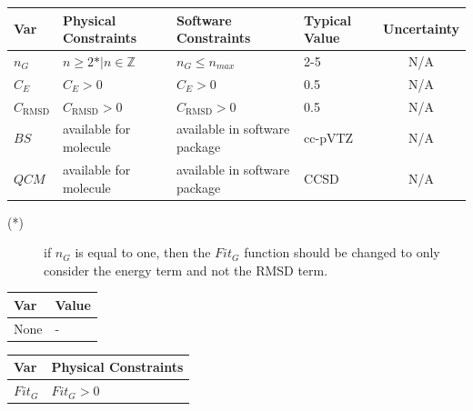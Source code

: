 \documentclass[12pt]{article}
\begin{document}
\begin{table}[!h]
  \caption{Input Variables} \label{TblInputVar}
  \renewcommand{\arraystretch}{1.2}
\noindent \begin{longtable*}{l l l l c} 
  \toprule
  \textbf{Var} & \textbf{Physical Constraints} & \textbf{Software Constraints} &
                             \textbf{Typical Value} & \textbf{Uncertainty}\\
  \midrule 
  $n_G$ & $n\geq 2\text{*} | n\in{\mathbb{Z}}$ & $n_G \leq n_{max}$ & 2-5 & N/A 
  \\
  $C_E$ & $C_E > 0$ & $C_E > 0$ & 0.5 & N/A \\
  $C_\text{RMSD}$ & $C_\text{RMSD} > 0$ & $C_\text{RMSD} > 0$ & 0.5 & N/A \\
  $BS$ & available for molecule & available in software package & cc-pVTZ & N/A 
  \\
  $QCM$& available for molecule & available in software package & CCSD & N/A \\
  \bottomrule
\end{longtable*}
\end{table}

\noindent 
\begin{description}
\item[(*)] if $n_G$ is equal to one, then the $Fit_G$ function should be 
changed to only consider the energy term and not the RMSD term.
\end{description}

\begin{table}[!h]
\caption{Specification Parameter Values} \label{TblSpecParams}
\renewcommand{\arraystretch}{1.2}
\noindent \begin{longtable*}{l l} 
  \toprule
  \textbf{Var} & \textbf{Value} \\
  \midrule 
  None & - \\
  \bottomrule
\end{longtable*}
\end{table}

\begin{table}[!h]
\caption{Output Variables} \label{TblOutputVar}
\renewcommand{\arraystretch}{1.2}
\noindent \begin{longtable*}{l l} 
  \toprule
  \textbf{Var} & \textbf{Physical Constraints} \\
  \midrule 
  $Fit_G$ & $Fit_G > 0$
  \\
  \bottomrule
\end{longtable*}
\end{table}
\end{document}
